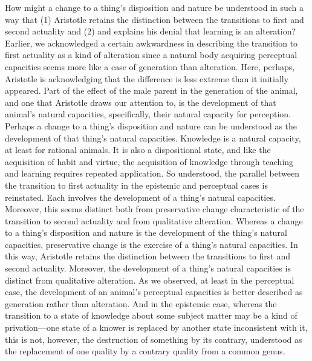 How might a change to a thing's disposition and nature be understood in such a way that (1) Aristotle retains the distinction between the transitions to first and second actuality and (2) and explains his denial that learning is an alteration? Earlier, we acknowledged a certain awkwardness in describing the transition to first actuality as a kind of alteration since a natural body acquiring perceptual capacities seems more like a case of generation than alteration. Here, perhaps, Aristotle is acknowledging that the difference is less extreme than it initially appeared. Part of the effect of the male parent in the generation of the animal, and one that Aristotle draws our attention to, is the development of that animal's natural capacities, specifically, their natural capacity for perception. Perhaps a change to a thing's disposition and nature can be understood as the development of that thing's natural capacities. Knowledge is a natural capacity, at least for rational animals. It is also a dispositional state, and like the acquisition of habit and virtue, the acquisition of knowledge through teaching and learning requires repeated application. So understood, the parallel between the transition to first actuality in the epistemic and perceptual cases is reinstated. Each involves the development of a thing's natural capacities. Moreover, this seems distinct both from preservative change characteristic of the transition to second actuality and from qualitative alteration. Whereas a change to a thing's disposition and nature is the development of the thing's natural capacities, preservative change is the exercise of a thing's natural capacities. In this way, Aristotle retains the distinction between the transitions to first and second actuality. Moreover, the development of a thing's natural capacities is distinct from qualitative alteration. As we observed, at least in the perceptual case, the development of an animal's perceptual capacities is better described as generation rather than alteration. And in the epistemic case, whereas the transition to a state of knowledge about some subject matter may be a kind of privation---one state of a knower is replaced by another state inconsistent with it, this is not, however, the destruction of something by its contrary, understood as the replacement of one quality by a contrary quality from a common genus.


